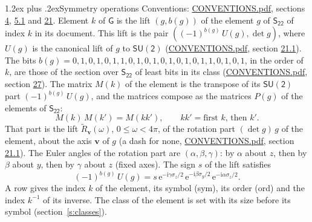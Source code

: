 \documentclass[10pt,a4paper]{article}
\makeatletter
\renewcommand\section{\@startsection{section}{1}{\z@}{-3ex plus -1ex minus -.2ex}%
  {1.2ex plus .2ex}{\normalfont\large\sffamily\bfseries\color{parttitle}}}
\numberwithin{equation}{section}
\newcommand{\grp}[1]{\mathsf{#1}}
\newcommand{\vv}{\mathbf{v}}
\newcommand{\iunit}{\mathrm{i}}
\newcommand{\expe}{\mathrm{e}}
\newcommand{\lift}[1]{\tilde{#1}}
\newcommand{\pauli}[1]{\sigma_{#1}}
\makeatother
\begin{document}
\section{Symmetry operations}\label{s:elements}
Conventions: \href{../../CONVENTIONS.pdf}{CONVENTIONS.pdf}, sections \href{../../../rotation/CONVENTIONS.pdf\#conv.4}{4}, \href{../../../rotation/CONVENTIONS.pdf\#conv.5.1}{5.1} and \href{../../CONVENTIONS.pdf\#conv.21}{21}.
\leavevmode\label{n:index.element}\label{n:element.g}\label{n:function.section}Element $k$ of $\grp{G}$ is the lift $(g, b(g))$ of the element $g$ of \href{../../../rotation/data/pdf/S22.pdf}{$\grp{S_{22}}$} of index $k$ in its document. This lift is the pair $((-1)^{b(g)}\,U(g), \det g)$, where $U(g)$ is the canonical lift of $g$ to $\grp{SU(2)}$ (\href{../../CONVENTIONS.pdf}{CONVENTIONS.pdf}, section \href{../../CONVENTIONS.pdf\#conv.21.1}{21.1}). The bits $b(g) = 0, 1, 0, 1, 0, 1, 1, 0, 1, 0, 1, 0, 1, 0, 1, 0, 1, 1, 0, 1, 0, 1$, in the order of $k$, are those of the section over $\grp{S_{22}}$ of least bits in its class (\href{../../CONVENTIONS.pdf}{CONVENTIONS.pdf}, section \href{../../CONVENTIONS.pdf\#conv.27}{27}). \label{n:matrix.element.pin}\label{n:matrix.element}The matrix $M(k)$ of the element is the transpose of its $\grp{SU(2)}$ part $(-1)^{b(g)}\,U(g)$, and the matrices compose as the matrices $P(g)$ of the elements of $\grp{S_{22}}$:
\begin{equation}\label{e:mprod}M(k)\,M(k') = M(kk'),\qquad kk' = \text{first } k\text{, then } k'.\end{equation}
\leavevmode\label{n:angle.omega}\label{n:vector.axis}\label{n:vector.pole}That part is the lift $\lift{R}_{\vv}(\omega)$, $0 \le \omega < 4\pi$, of the rotation part $(\det g)\,g$ of the element, about the axis $\vv$ of $g$ (a dash for none, \href{../../CONVENTIONS.pdf}{CONVENTIONS.pdf}, section \href{../../CONVENTIONS.pdf\#conv.21.1}{21.1}). \label{n:angle.euler.alpha}\label{n:angle.euler.beta}\label{n:angle.euler.gamma}\label{n:vector.coordinates}The Euler angles of the rotation part are $(\alpha,\beta,\gamma)$: by $\alpha$ about $z$, then by $\beta$ about $y$, then by $\gamma$ about $z$ (fixed axes). \label{n:local.euler.sign}The sign $s$ of the lift satisfies
\begin{equation}\label{e:euler}(-1)^{b(g)}\,U(g) = s\,\expe^{-\iunit\gamma\pauli{z}/2}\,\expe^{-\iunit\beta\pauli{y}/2}\,\expe^{-\iunit\alpha\pauli{z}/2}.\end{equation}
\leavevmode\label{n:index.element.inverse}\label{n:head.sym}\label{n:head.ord}A row gives the index $k$ of the element, its symbol (sym), its order (ord) and the index $k^{-1}$ of its inverse. \label{n:head.class}The class of the element is set with its size before its symbol (section~\ref{s:classes}).
\end{document}
